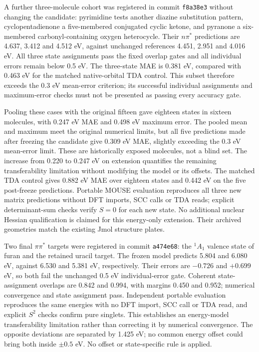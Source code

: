 A further three-molecule cohort was registered in commit \texttt{f8a38e3}
without changing the candidate: pyrimidine tests another diazine substitution
pattern, cyclopentadienone a five-membered conjugated cyclic ketone, and
pyranone a six-membered carbonyl-containing oxygen heterocycle. Their
$n\pi^*$ predictions are 4.637, 3.412 and 4.512 eV, against unchanged
references 4.451, 2.951 and 4.016 eV. All three state assignments pass the
fixed overlap gates and all individual errors remain below 0.5 eV. The
three-state MAE is 0.381 eV, compared with 0.463 eV for the matched native-orbital
TDA control. This subset therefore exceeds the 0.3 eV mean-error criterion;
its successful individual assignments and maximum-error checks must not be
presented as passing every accuracy gate.

Pooling these cases with the original fifteen gave eighteen states in
sixteen molecules, with 0.247 eV MAE and 0.498 eV maximum error. The pooled
mean and maximum meet the original numerical limits, but all five predictions
made after freezing the candidate give 0.309 eV MAE, slightly exceeding the
0.3 eV mean-error limit. These are historically exposed molecules, not a blind
set. The increase from 0.220 to 0.247 eV on extension quantifies the remaining
transferability limitation without modifying the model or its offsets.
The matched TDA control gives 0.882 eV MAE over eighteen states and 0.442 eV
on the five post-freeze predictions. Portable MOUSE evaluation reproduces
all three new matrix predictions without DFT imports, SCC calls or TDA reads;
explicit determinant-sum checks verify $S=0$ for each new state. No additional
nuclear Hessian qualification is claimed for this energy-only extension.
Their archived geometries match the existing Jmol structure plates.


Two final $\pi\pi^*$ targets were registered in commit \texttt{a474e68}:
the $^1A_1$ valence state of furan and the retained uracil target.
The frozen model predicts 5.804 and 6.080 eV, against 6.530 and 5.381 eV,
respectively. Their errors are $-0.726$ and $+0.699$ eV, so both fail the
unchanged 0.5 eV individual-error gate. Coherent state-assignment overlaps
are 0.842 and 0.994, with margins 0.450 and 0.952; numerical convergence
and state assignment pass. Independent portable evaluation reproduces the
same energies with no DFT import, SCC call or TDA read, and explicit
$S^2$ checks confirm pure singlets. This establishes an energy-model
transferability limitation rather than correcting it by numerical convergence.
The opposite deviations are separated by 1.425 eV; no common energy offset
could bring both inside $\pm0.5$ eV. No offset or state-specific rule is applied.

